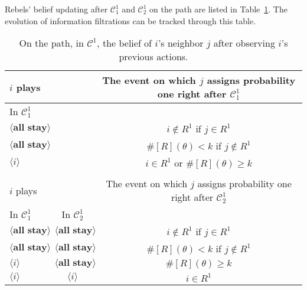 \documentclass[12pt,letter]{article}
\newcommand{\Kappa}{\mathcal{C}}
\theoremstyle{definition}
\theoremstyle{remark}
\theoremstyle{claim}
\begin{document}

Rebels' belief updating after $\Kappa^1_1$ and $\Kappa^1_2$ on the path are listed in Table~\ref{Table_blf_cd0}. The evolution of information filtrations can be tracked through this table.

\begin{table}[!htbp]
\caption{On the path,  in $\Kappa^1$, the belief of $i$'s neighbor $j$ after observing $i$'s previous actions.}
\label{Table_blf_cd0}
\begin{center}
\begin{tabular}{l  c | c}
 	$i$ plays	  			&	  &  The event on which $j$ assigns probability one  right after $\Kappa^1_{1}$\\
\hline
\hline
In $\Kappa^1_{1}$	&		&		  \\
\hline
  $\langle \textbf{all stay} \rangle$	& &   $i\notin R^1$ if $j\in R^1$ \\
  $\langle \textbf{all stay} \rangle$	&  &  $\#[R](\theta)< k$ if $j\notin R^1$\\
  $\langle i \rangle$	&	&  $i\in R^1$ or $\#[R](\theta)\geq k$    \\
  \hline
  \\
 	$i$ plays	  	&  	  &The event on which $j$ assigns probability one  right after $\Kappa^1_{2}$\\
\hline
\hline
	In $\Kappa^1_{1}$		&			In $\Kappa^1_{2}$	&  \\
\hline
  $\langle \textbf{all stay} \rangle$	&  $\langle \textbf{all stay} \rangle$ &  $i\notin R^1$ if $j\in R^1$ \\
  $\langle \textbf{all stay} \rangle$	&  $\langle \textbf{all stay} \rangle$ &  $\#[R](\theta)< k$ if $j\notin R^1$\\
  $\langle i \rangle$	&	$\langle \textbf{all stay} \rangle$ &  $\#[R](\theta)\geq k$    \\
  $\langle i \rangle$	&	$\langle i \rangle$ &  $i\in R^1$  \\
  \hline
\end{tabular}
\end{center}
\end{table}
\end{document}

